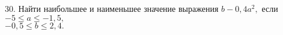30. Найти наибольшее и наименьшее значение выражения $b-0,4a^2,$ если $-5\leqslant a\leqslant-1,5,$\\$-0,5\leqslant b\leqslant2,4.$\\
